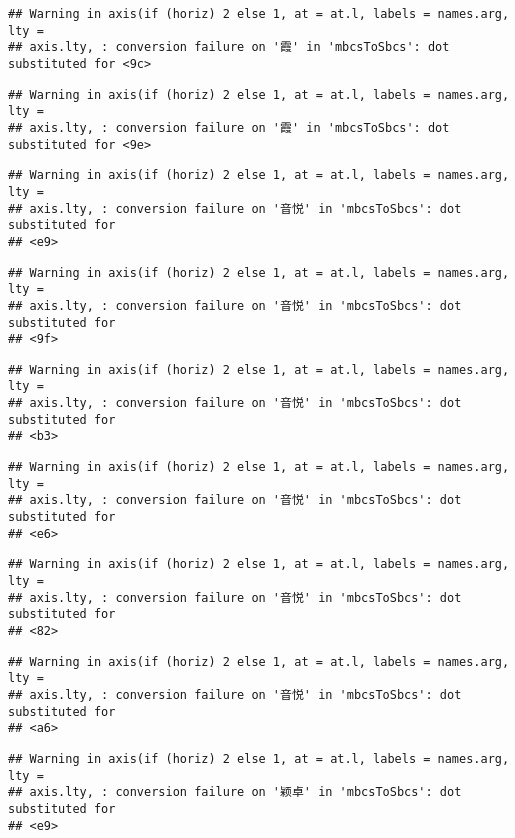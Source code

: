 \documentclass[
]{article}
\begin{document}
\begin{verbatim}
## Warning in axis(if (horiz) 2 else 1, at = at.l, labels = names.arg, lty =
## axis.lty, : conversion failure on '霞' in 'mbcsToSbcs': dot substituted for <9c>
\end{verbatim}

\begin{verbatim}
## Warning in axis(if (horiz) 2 else 1, at = at.l, labels = names.arg, lty =
## axis.lty, : conversion failure on '霞' in 'mbcsToSbcs': dot substituted for <9e>
\end{verbatim}

\begin{verbatim}
## Warning in axis(if (horiz) 2 else 1, at = at.l, labels = names.arg, lty =
## axis.lty, : conversion failure on '音悦' in 'mbcsToSbcs': dot substituted for
## <e9>
\end{verbatim}

\begin{verbatim}
## Warning in axis(if (horiz) 2 else 1, at = at.l, labels = names.arg, lty =
## axis.lty, : conversion failure on '音悦' in 'mbcsToSbcs': dot substituted for
## <9f>
\end{verbatim}

\begin{verbatim}
## Warning in axis(if (horiz) 2 else 1, at = at.l, labels = names.arg, lty =
## axis.lty, : conversion failure on '音悦' in 'mbcsToSbcs': dot substituted for
## <b3>
\end{verbatim}

\begin{verbatim}
## Warning in axis(if (horiz) 2 else 1, at = at.l, labels = names.arg, lty =
## axis.lty, : conversion failure on '音悦' in 'mbcsToSbcs': dot substituted for
## <e6>
\end{verbatim}

\begin{verbatim}
## Warning in axis(if (horiz) 2 else 1, at = at.l, labels = names.arg, lty =
## axis.lty, : conversion failure on '音悦' in 'mbcsToSbcs': dot substituted for
## <82>
\end{verbatim}

\begin{verbatim}
## Warning in axis(if (horiz) 2 else 1, at = at.l, labels = names.arg, lty =
## axis.lty, : conversion failure on '音悦' in 'mbcsToSbcs': dot substituted for
## <a6>
\end{verbatim}

\begin{verbatim}
## Warning in axis(if (horiz) 2 else 1, at = at.l, labels = names.arg, lty =
## axis.lty, : conversion failure on '颖卓' in 'mbcsToSbcs': dot substituted for
## <e9>
\end{verbatim}
\end{document}
